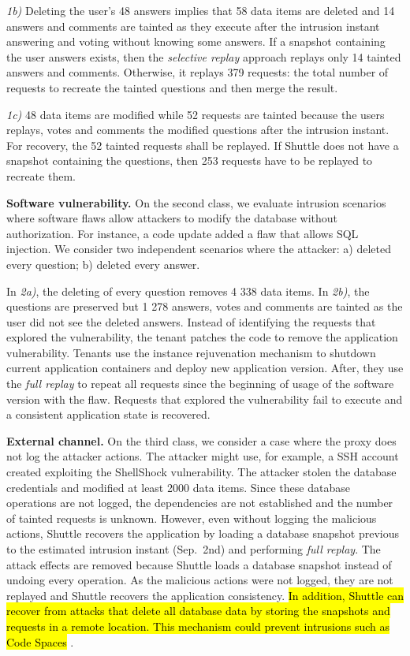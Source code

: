 \textit{1b)} Deleting the user's 48 answers implies that 58 data items are deleted and 14 answers and comments are tainted as they execute after the intrusion instant answering and voting without knowing some answers. If a snapshot containing the user answers exists, then the \textit{selective replay} approach replays only 14 tainted answers and comments. Otherwise, it replays 379 requests: the total number of requests to recreate the tainted questions and then merge the result.


\textit{1c)} 48 data items are modified while 52 requests are tainted because the users replays, votes and comments the modified questions after the intrusion instant. For recovery, the 52 tainted requests shall be replayed. If Shuttle does not have a snapshot containing the questions, then 253 requests have to be replayed to recreate them. 

\textbf{Software vulnerability.}
On the second class, we evaluate intrusion scenarios where software flaws allow attackers to modify the database without authorization. For instance, a code update added a flaw that allows SQL injection. We consider two independent scenarios where the attacker: a) deleted every question; b) deleted every answer.

In \textit{2a)}, the deleting of every question removes 4 338 data items. In \textit{2b)}, the questions are preserved but 1 278 answers, votes and comments are tainted as the user did not see the deleted answers.
%
Instead of identifying the requests that explored the vulnerability, the tenant patches the code to remove the application vulnerability. Tenants use the instance rejuvenation mechanism to shutdown current application containers and deploy new application version. After, they use the \textit{full replay} to repeat all requests since the beginning of usage of the software version with the flaw. Requests that explored the vulnerability fail to execute and a consistent application state is recovered.



\textbf{External channel.}
On the third class, we consider a case where the proxy does not log the attacker actions. The attacker might use, for example, a SSH account created exploiting the ShellShock vulnerability. The attacker stolen the database credentials and modified at least 2000 data items. Since these database operations are not logged, the dependencies are not established and the number of tainted requests is unknown. However, even without logging the malicious actions, Shuttle recovers the application by loading a database snapshot previous to the estimated intrusion instant (Sep.~2nd) and performing \textit{full replay}. The attack effects are removed because Shuttle loads a database snapshot instead of undoing every operation. As the malicious actions were not logged, they are not replayed and Shuttle recovers the application consistency. \hl{In addition, Shuttle can recover from attacks that delete all database data by storing the snapshots and requests in a remote location. This mechanism could prevent intrusions such as Code Spaces} \cite{McAllister:14}.


